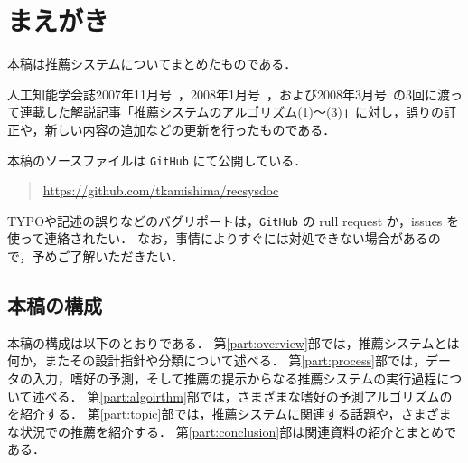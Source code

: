 
\chapter*{まえがき}
\label{sec:preface}

本稿は推薦システムについてまとめたものである．

人工知能学会誌2007年11月号~\cite{jpublist:076}，2008年1月号~\cite{jpublist:081}，および2008年3月号~\cite{jpublist:083}の3回に渡って連載した解説記事「推薦システムのアルゴリズム(1)〜(3)」に対し，誤りの訂正や，新しい内容の追加などの更新を行ったものである．

本稿のソースファイルは \texttt{GitHub} にて公開している．
\begin{quote}
\url{https://github.com/tkamishima/recsysdoc}
\end{quote}
TYPOや記述の誤りなどのバグリポートは，\texttt{GitHub} の rull request か，issues を使って連絡されたい．
なお，事情によりすぐには対処できない場合があるので，予めご了解いただきたい．

\section*{本稿の構成}
\label{sec:preface-organization}

本稿の構成は以下のとおりである．
第\ref{part:overview}部では，推薦システムとは何か，またその設計指針や分類について述べる．
第\ref{part:process}部では，データの入力，嗜好の予測，そして推薦の提示からなる推薦システムの実行過程について述べる．
第\ref{part:algoirthm}部では，さまざまな嗜好の予測アルゴリズムのを紹介する．
第\ref{part:topic}部では，推薦システムに関連する話題や，さまざまな状況での推薦を紹介する．
第\ref{part:conclusion}部は関連資料の紹介とまとめである．
